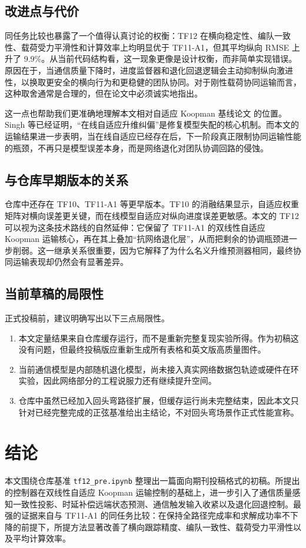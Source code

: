 \documentclass[twocolumn,3p,times,procedia]{elsarticle}
\newcommand{\tfone}{TF11-A1}
\newcommand{\tftwo}{TF12}
\begin{document}
\subsection{改进点与代价}
同任务比较也暴露了一个值得认真讨论的权衡：\tftwo{} 在横向稳定性、编队一致性、载荷受力平滑性和计算效率上均明显优于 \tfone{}，但其平均纵向 RMSE 上升了 9.9\%。从当前代码结构看，这一现象更像是设计权衡，而非简单实现错误。原因在于，当通信质量下降时，进度监督器和退化回退逻辑会主动抑制纵向激进性，以换取更安全的横向行为和更稳健的团队协同。对于刚性载荷协同运输而言，这种取舍通常是合理的，但在论文中必须诚实地指出。

这一点也帮助我们更准确地理解本文相对自适应 Koopman 基线论文 \cite{singh2024adaptive} 的位置。Singh 等已经证明，“在线自适应升维纠偏”是修复模型失配的核心机制。而本文的运输结果进一步表明，当在线自适应已经存在后，下一阶段真正限制协同运输性能的瓶颈，不再只是模型误差本身，而是网络退化对团队协调回路的侵蚀。

\subsection{与仓库早期版本的关系}
仓库中还存在 TF10、\tfone{} 等更早版本。TF10 的消融结果显示，自适应权重矩阵对横向误差更关键，而在线模型自适应对纵向进度误差更敏感。本文的 \tftwo{} 可以视为这条技术路线的自然延伸：它保留了 \tfone{} 的双线性自适应 Koopman 运输核心，再在其上叠加“抗网络退化层”，从而把剩余的协调瓶颈进一步削弱。这一继承关系很重要，因为它解释了为什么名义升维预测器相同，最终协同运输表现却仍然会有显著差异。

\subsection{当前草稿的局限性}
正式投稿前，建议明确写出以下三点局限性。
\begin{enumerate}
    \item 本文定量结果来自仓库缓存运行，而不是重新完整复现实验所得。作为初稿这没有问题，但最终投稿版应重新生成所有表格和英文版高质量图件。
    \item 当前通信模型是内部随机退化模型，尚未接入真实网络数据包轨迹或硬件在环实验，因此网络部分的工程说服力还有继续提升空间。
    \item 仓库中虽然已经加入回头弯路径扩展，但缓存运行尚未完整结束，因此本文只针对已经完整完成的正弦基准给出主结论，不对回头弯场景作正式性能宣称。
\end{enumerate}

\section{结论}
本文围绕仓库基准 \texttt{tf12\_pre.ipynb} 整理出一篇面向期刊投稿格式的初稿。所提出的控制器在双线性自适应 Koopman 运输控制的基础上，进一步引入了通信质量感知一致性投影、时延补偿远端状态预测、通信触发输入收紧以及退化回退控制。最强的证据来自与 \tfone{} 的同任务比较：在保持全路径完成率和求解成功率不下降的前提下，所提方法显著改善了横向跟踪精度、编队一致性、载荷受力平滑性以及平均计算效率。
\end{document}
